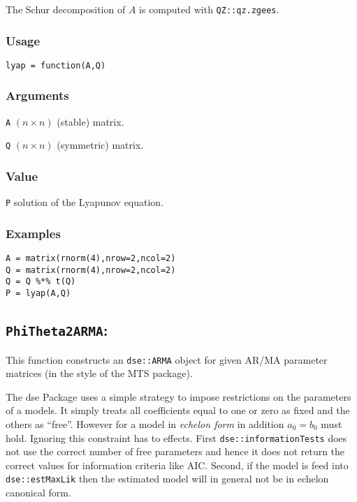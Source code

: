 \documentclass[]{article}
\begin{document}
The Schur decomposition of \(A\) is computed with \texttt{QZ::qz.zgees}.

\subsubsection*{Usage}\begin{verbatim}
lyap = function(A,Q) 
\end{verbatim}\subsubsection*{Arguments}\begin{description}
\item \texttt{A} $(n \times n)$ (stable) matrix.
\item \texttt{Q} $(n \times n)$ (symmetric) matrix.
\end{description}\subsubsection*{Value}\begin{description}
\item \texttt{P} solution of the Lyapunov equation.
\end{description}\subsubsection*{Examples}\begin{verbatim}
A = matrix(rnorm(4),nrow=2,ncol=2)
Q = matrix(rnorm(4),nrow=2,ncol=2)
Q = Q %*% t(Q)
P = lyap(A,Q)
\end{verbatim}

\subsection{\texorpdfstring{\texttt{PhiTheta2ARMA}:}{PhiTheta2ARMA:}}\label{phitheta2arma}

This function constructs an \texttt{dse::ARMA} object for given AR/MA
parameter matrices (in the style of the MTS package).

The dse Package uses a simple strategy to impose restrictions on the
parameters of a models. It simply treats all coefficients equal to one
or zero as fixed and the others as ``free''. However for a model in
\emph{echelon form} in addition \(a_0=b_0\) must hold. Ignoring this
constraint has to effects. First \texttt{dse::informationTests} does not
use the correct number of free parameters and hence it does not return
the correct values for information criteria like AIC. Second, if the
model is feed into \texttt{dse::estMaxLik} then the estimated model will
in general not be in echelon canonical form.
\end{document}
